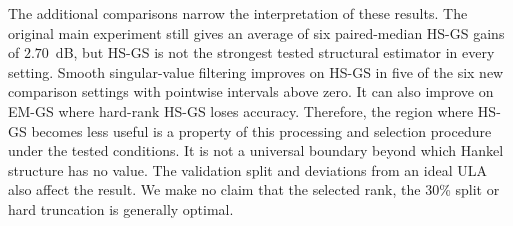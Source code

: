 
The additional comparisons narrow the interpretation of these results.
The original main experiment still gives an average of six paired-median
HS-GS gains of $2.70$~dB, but HS-GS is not the strongest tested structural
estimator in every setting. Smooth singular-value filtering improves on
HS-GS in five of the six new comparison settings with pointwise intervals
above zero. It can also improve on EM-GS where hard-rank HS-GS loses
accuracy. Therefore, the region where HS-GS becomes less useful is a
property of this processing and selection procedure under the tested
conditions. It is not a universal boundary beyond which Hankel structure
has no value. The validation split and deviations from an ideal ULA also
affect the result. We make no claim that the selected rank, the 30\% split
or hard truncation is generally optimal.
